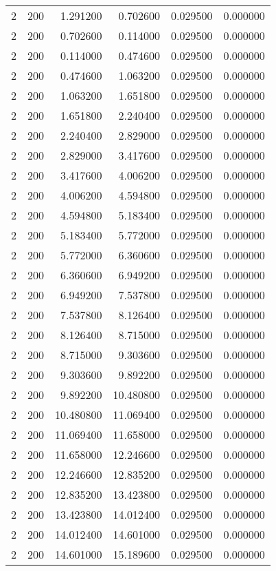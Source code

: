 \begin{longtable}{rrrrrr}
2 & 200 & 1.291200 & 0.702600 & 0.029500 & 0.000000 \\
2 & 200 & 0.702600 & 0.114000 & 0.029500 & 0.000000 \\
2 & 200 & 0.114000 & 0.474600 & 0.029500 & 0.000000 \\
2 & 200 & 0.474600 & 1.063200 & 0.029500 & 0.000000 \\
2 & 200 & 1.063200 & 1.651800 & 0.029500 & 0.000000 \\
2 & 200 & 1.651800 & 2.240400 & 0.029500 & 0.000000 \\
2 & 200 & 2.240400 & 2.829000 & 0.029500 & 0.000000 \\
2 & 200 & 2.829000 & 3.417600 & 0.029500 & 0.000000 \\
2 & 200 & 3.417600 & 4.006200 & 0.029500 & 0.000000 \\
2 & 200 & 4.006200 & 4.594800 & 0.029500 & 0.000000 \\
2 & 200 & 4.594800 & 5.183400 & 0.029500 & 0.000000 \\
2 & 200 & 5.183400 & 5.772000 & 0.029500 & 0.000000 \\
2 & 200 & 5.772000 & 6.360600 & 0.029500 & 0.000000 \\
2 & 200 & 6.360600 & 6.949200 & 0.029500 & 0.000000 \\
2 & 200 & 6.949200 & 7.537800 & 0.029500 & 0.000000 \\
2 & 200 & 7.537800 & 8.126400 & 0.029500 & 0.000000 \\
2 & 200 & 8.126400 & 8.715000 & 0.029500 & 0.000000 \\
2 & 200 & 8.715000 & 9.303600 & 0.029500 & 0.000000 \\
2 & 200 & 9.303600 & 9.892200 & 0.029500 & 0.000000 \\
2 & 200 & 9.892200 & 10.480800 & 0.029500 & 0.000000 \\
2 & 200 & 10.480800 & 11.069400 & 0.029500 & 0.000000 \\
2 & 200 & 11.069400 & 11.658000 & 0.029500 & 0.000000 \\
2 & 200 & 11.658000 & 12.246600 & 0.029500 & 0.000000 \\
2 & 200 & 12.246600 & 12.835200 & 0.029500 & 0.000000 \\
2 & 200 & 12.835200 & 13.423800 & 0.029500 & 0.000000 \\
2 & 200 & 13.423800 & 14.012400 & 0.029500 & 0.000000 \\
2 & 200 & 14.012400 & 14.601000 & 0.029500 & 0.000000 \\
2 & 200 & 14.601000 & 15.189600 & 0.029500 & 0.000000 \\

\end{longtable}
